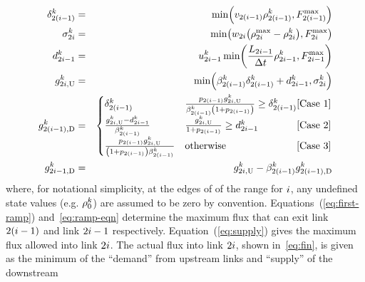 			\begin{eqnarray}
				\demand_{2\left(\link-1\right)}^{\tind} & = & \min\left(\ffspeed_{2\left(i-1\right)}\densitydiscrete{2\left(\link-1\right)}{\tind},F_{2\left(\link-1\right)}^{\max}\right)\label{eq:first-ramp}\\
				\supply_{2\link}^{\tind} & = & \min\left(\congspeed_{2i}\left(\density_{2i}^{\max}-\densitydiscrete{2\link}{\tind}\right),F_{2i}^{\max}\right)\label{eq:supply}\\
				\rampDemand_{2\link-1}^{\tind} & = & \ramp_{2\link-1}^{\tind}\min\left(\frac{\length_{2\link-1}}{\Delta t}\densitydiscrete{2\link-1}{\tind},F_{2i-1}^{\max}\right)\label{eq:ramp-eqn}\\
				\fin{2\link}{\tind} & = & \min\left(\splitratio_{2\left(\link-1\right)}^{\tind}\demand_{2\left(\link-1\right)}^{\tind}+\rampDemand_{2\link-1}^{\tind},\supply_{2\link}^{\tind}\right)\label{eq:fin}\\
				\fout{2\left(\link-1\right)}{\tind} & = & \begin{cases}
				\demand_{2\left(\link-1\right)}^{\tind} & \frac{p_{2(\link-1)}\fin{2\link}{\tind}}{\splitratio_{2\left(\link-1\right)}^{\tind}\left(1+p_{2(\link-1)}\right)}\ge\demand_{2\left(\link-1\right)}^{\tind}\hfill\text{[Case 1]}\\
				\frac{\fin{2\link}{\tind}-\rampDemand_{2\link-1}^{\tind}}{\splitratio_{2\left(\link-1\right)}^{\tind}} & \frac{\fin{2\link}{\tind}}{1+p_{2(\link-1)}}\ge\rampDemand_{2\link-1}^{\tind}\hfill\text{[Case 2}]\\
				\frac{p_{2(\link-1)}\fin{2\link}{\tind}}{\left(1+p_{2(\link-1)}\right)\splitratio_{2\left(\link-1\right)}^{\tind}} & \text{otherwise}\hfill[\text{Case 3]}
				\end{cases}\label{eq:merge}\\
				\fout{2\link-1}{\tind} & = & \fin{2\link}{\tind}-\splitratio_{2\left(\link-1\right)}^{\tind}\fout{2\left(\link-1\right)}{\tind}\label{eq:last-ramp}
			\end{eqnarray}
			where, for notational simplicity, at the edges of of the range for
			$i$, any undefined state values (e.g. $\rho_{0}^{k}$)
			are assumed to be zero by convention. Equations~(\eqref{eq:first-ramp})
			and~\eqref{eq:ramp-eqn} determine the maximum flux that can exit
			link $2(i-1)$ and link $2i-1$ respectively. Equation~(\eqref{eq:supply})
			gives the maximum flux allowed into link $2i$. The actual flux
			into link $2i$, shown in~\eqref{eq:fin}, is given as the minimum
			of the ``demand'' from upstream links and ``supply'' of the downstream
